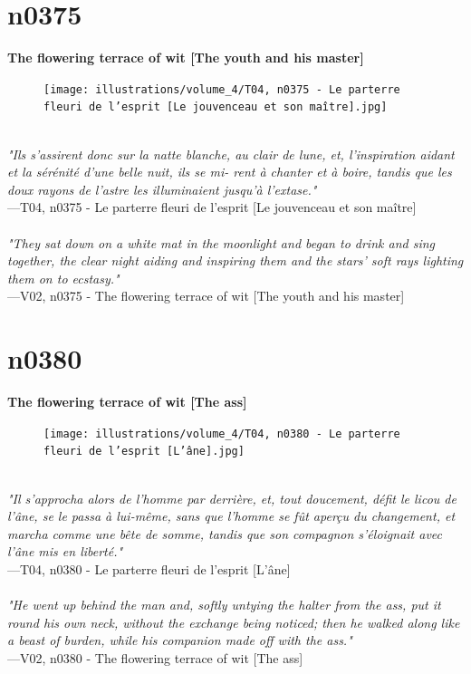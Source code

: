 \documentclass[../Carre_nights.tex]{subfiles}
\begin{document}
\newpage

\section{n0375}
\textbf{\Large{The flowering terrace of wit [The youth and his master]}} \\

\begin{figure}[ht]
\centering
\texttt{[image: illustrations/volume\_4/T04, n0375 - Le parterre fleuri de l'esprit [Le jouvenceau et son maître].jpg]}
\end{figure}

\textit{\\
"Ils s’assirent donc sur la natte blanche, au clair de lune, et, l’inspiration aidant et la sérénité d’une belle nuit, ils se mi- rent à chanter et à boire, tandis que les doux rayons de l’astre les illuminaient jusqu’à l’extase."} \\
—T04, n0375 - Le parterre fleuri de l'esprit [Le jouvenceau et son maître] \\~\\
\textit{"They sat down on a white mat in the moonlight and began to drink and sing together, the clear night aiding and inspiring them and the stars' soft rays lighting them on to ecstasy."} \\
—V02, n0375 - The flowering terrace of wit [The youth and his master]

\newpage

\section{n0380}
\textbf{\Large{The flowering terrace of wit [The ass]}} \\

\begin{figure}[ht]
\centering
\texttt{[image: illustrations/volume\_4/T04, n0380 - Le parterre fleuri de l'esprit [L'âne].jpg]}
\end{figure}

\textit{\\
"Il s’approcha alors de l’homme par derrière, et, tout doucement, défit le licou de l’âne, se le passa à lui-même, sans que l’homme se fût aperçu du changement, et marcha comme une bête de somme, tandis que son compagnon s’éloignait avec l’âne mis en liberté."} \\
—T04, n0380 - Le parterre fleuri de l'esprit [L'âne] \\~\\
\textit{"He went up behind the man and, softly untying the halter from the ass, put it round his own neck, without the exchange being noticed; then he walked along like a beast of burden, while his companion made off with the ass."} \\
—V02, n0380 - The flowering terrace of wit [The ass]
\end{document}
